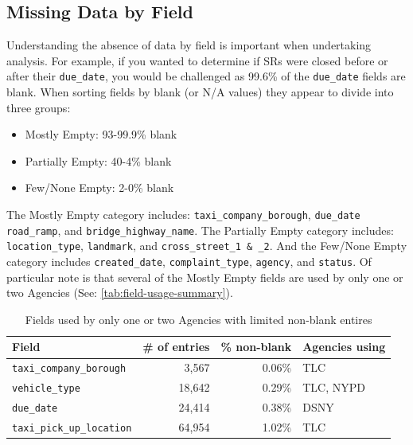 \documentclass[linenumber]{jdsart}
\begin{document}
\subsection{Missing Data by Field}
\label{sec:blanks}
Understanding the absence of data by field is important 
when undertaking analysis. For example, if you wanted to 
determine if SRs were closed before or after their
\texttt{due\_date}, you would be challenged as 99.6\% of the
\texttt{due\_date} fields are blank. When sorting fields by
blank (or N/A values) they appear to divide into three groups:


\begin{itemize}[left=1.5em]
    \item Mostly Empty: 93-99.9\% blank 
    \item Partially Empty: 40-4\% blank
    \item Few/None Empty: 2-0\% blank
\end{itemize}

The Mostly Empty category includes:
\texttt{taxi\_company\_borough}, \texttt{due\_date}
\texttt{road\_ramp}, and \texttt{bridge\_highway\_name}. The 
Partially Empty category includes:
\texttt{location\_type}, \texttt{landmark}, 
and \texttt{cross\_street\_1 \& \_2}. And the Few/None Empty 
category includes \texttt{created\_date}, \texttt{complaint\_type},
\texttt{agency}, and \texttt{status}. Of particular note is that 
several of the Mostly Empty fields are used by only one or 
two Agencies (See: \autoref{tab:field-usage-summary}).

\begin{table}[htbp]
    \centering
    \caption{Fields used by only one or two Agencies with limited non-blank entires}
    \label{tab:field-usage-summary}
    \begin{tabular}{l r r p{4cm}}
        \toprule
        \textbf{Field} & \textbf{\# of entries} & \textbf{\% non-blank} & \textbf{Agencies using} \\
        \midrule
        \texttt{taxi\_company\_borough} & 3,567  & 0.06\% & TLC \\
        \texttt{vehicle\_type}           & 18,642 & 0.29\% & TLC, NYPD \\
        \texttt{due\_date}               & 24,414 & 0.38\% & DSNY \\
        \texttt{taxi\_pick\_up\_location} & 64,954 & 1.02\% & TLC \\
        \bottomrule
    \end{tabular}
\end{table}
\end{document}
